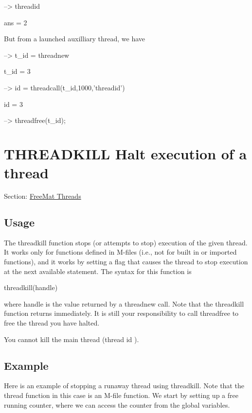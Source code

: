 \begin{DoxyVerbInclude}
--> threadid

ans = 
 2 
\end{DoxyVerbInclude}


But from a launched auxilliary thread, we have


\begin{DoxyVerbInclude}
--> t_id = threadnew

t_id = 
 3 

--> id = threadcall(t_id,1000,'threadid')

id = 
 3 

--> threadfree(t_id);
\end{DoxyVerbInclude}
 \hypertarget{thread_threadkill}{}\section{T\-H\-R\-E\-A\-D\-K\-I\-L\-L Halt execution of a thread}\label{thread_threadkill}
Section\-: \hyperlink{sec_thread}{Free\-Mat Threads} \hypertarget{vtkwidgets_vtkxyplotwidget_Usage}{}\subsection{Usage}\label{vtkwidgets_vtkxyplotwidget_Usage}
The {\ttfamily threadkill} function stops (or attempts to stop) execution of the given thread. It works only for functions defined in M-\/files (i.\-e., not for built in or imported functions), and it works by setting a flag that causes the thread to stop execution at the next available statement. The syntax for this function is \begin{DoxyVerb}  threadkill(handle)
\end{DoxyVerb}
 where {\ttfamily handle} is the value returned by a {\ttfamily threadnew} call. Note that the {\ttfamily threadkill} function returns immediately. It is still your responsibility to call {\ttfamily threadfree} to free the thread you have halted.

You cannot kill the main thread (thread id {}). \hypertarget{variables_struct_Example}{}\subsection{Example}\label{variables_struct_Example}
Here is an example of stopping a runaway thread using {\ttfamily threadkill}. Note that the thread function in this case is an M-\/file function. We start by setting up a free running counter, where we can access the counter from the global variables.

